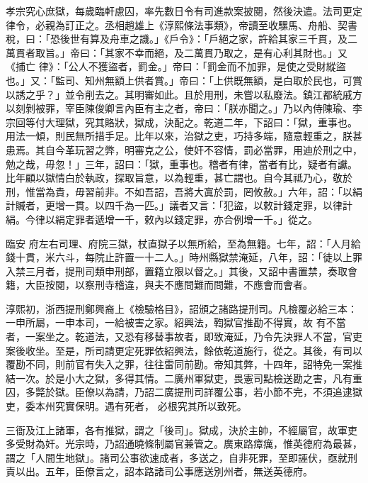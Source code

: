 \begin{pinyinscope}
 孝宗究心庶獄，每歲臨軒慮囚，率先數日令有司進款案披閱，然後決遣。法司更定律令，必親為訂正之。丞相趙雄上《淳熙條法事類》，帝讀至收騾馬、舟船、契書稅，曰：「恐後世有算及舟車之譏。」《戶令》：「戶絕之家，許給其家三千貫，及二萬貫者取旨。」帝曰：「其家不幸而絕，及二萬貫乃取之，是有心利其財也。」又《捕亡
 律》：「公人不獲盜者，罰金。」帝曰：「罰金而不加罪，是使之受財縱盜也。」又：「監司、知州無額上供者賞。」帝曰：「上供既無額，是白取於民也，可賞以誘之乎？」並令削去之。其明審如此。且於用刑，未嘗以私廢法。鎮江都統戚方以刻剝被罪，宰臣陳俊卿言內臣有主之者，帝曰：「朕亦聞之。」乃以內侍陳瑜、李宗回等付大理獄，究其賂狀，獄成，決配之。乾道二年，下詔曰：「獄，重事也。用法一傾，則民無所措手足。比年以來，治獄之吏，巧持多端，隨意輕重之，朕甚
 患焉。其自今革玩習之弊，明審克之公，使奸不容情，罰必當罪，用迪於刑之中，勉之哉，毋忽！」三年，詔曰：「獄，重事也。稽者有律，當者有比，疑者有讞。比年顧以獄情白於執政，探取旨意，以為輕重，甚亡謂也。自今其祗乃心，敬於刑，惟當為貴，毋習前非。不如吾詔，吾將大寘於罰，罔攸赦。」六年，詔：「以絹計贓者，更增一貫。以四千為一匹。」議者又言：「犯盜，以敕計錢定罪，以律計絹。今律以絹定罪者遞增一千，敕內以錢定罪，亦合例增一千。」從之。



 臨安
 府左右司理、府院三獄，杖直獄子以無所給，至為無籍。七年，詔：「人月給錢十貫，米六斗，每院止許置一十二人。」時州縣獄禁淹延，八年，詔：「徒以上罪入禁三月者，提刑司類申刑部，置籍立限以督之。」其後，又詔中書置禁，奏取會籍，大臣按閱，以察刑寺稽違，與夫不應問難而問難，不應會而會者。



 淳熙初，浙西提刑鄭興裔上《檢驗格目》，詔頒之諸路提刑司。凡檢覆必給三本：一申所屬，一申本司，一給被害之家。紹興法，鞫獄官推勘不得實，故
 有不當者，一案坐之。乾道法，又恐有移替事故者，即致淹延，乃令先決罪人不當，官吏案後收坐。至是，所司請更定死罪依紹興法，餘依乾道施行，從之。其後，有司以覆勘不同，則前官有失入之罪，往往雷同前勘。帝知其弊，十四年，詔特免一案推結一次。於是小大之獄，多得其情。二廣州軍獄吏，畏憲司點檢送勘之害，凡有重囚，多斃於獄。臣僚以為請，乃詔二廣提刑司詳覆公事，若小節不完，不須追逮獄吏，委本州究實保明。遇有死者，
 必根究其所以致死。



 三衙及江上諸軍，各有推獄，謂之「後司」。獄成，決於主帥，不經屬官，故軍吏多受財為奸。光宗時，乃詔通曉條制屬官兼管之。廣東路瘴癘，惟英德府為最甚，謂之「人間生地獄」。諸司公事欲速成者，多送之，自非死罪，至即誣伏，亟就刑責以出。五年，臣僚言之，詔本路諸司公事應送別州者，無送英德府。




\end{pinyinscope}
